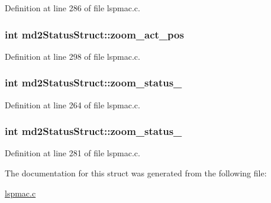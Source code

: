 Definition at line 286 of file lspmac.\-c.

\hypertarget{structmd2StatusStruct_a920b80e9f5f08aedac3ad541d5ffc8ae}{
\subsubsection[{zoom\-\_\-act\-\_\-pos}]{\setlength{\rightskip}{0pt plus 5cm}int md2\-Status\-Struct\-::zoom\-\_\-act\-\_\-pos}}\label{structmd2StatusStruct_a920b80e9f5f08aedac3ad541d5ffc8ae}


Definition at line 298 of file lspmac.\-c.

\hypertarget{structmd2StatusStruct_af28e978b761dc07eefed3971547cfd4d}{
\subsubsection[{zoom\-\_\-status\-\_\-1}]{\setlength{\rightskip}{0pt plus 5cm}int md2\-Status\-Struct\-::zoom\-\_\-status\-\_}}\label{structmd2StatusStruct_af28e978b761dc07eefed3971547cfd4d}


Definition at line 264 of file lspmac.\-c.

\hypertarget{structmd2StatusStruct_a34e4200315a083deb8a970e21bbbe277}{
\subsubsection[{zoom\-\_\-status\-\_\-2}]{\setlength{\rightskip}{0pt plus 5cm}int md2\-Status\-Struct\-::zoom\-\_\-status\-\_}}\label{structmd2StatusStruct_a34e4200315a083deb8a970e21bbbe277}


Definition at line 281 of file lspmac.\-c.



The documentation for this struct was generated from the following file\-:\begin{DoxyCompactItemize}
\item 
\hyperlink{lspmac_8c}{lspmac.\-c}\end{DoxyCompactItemize}
